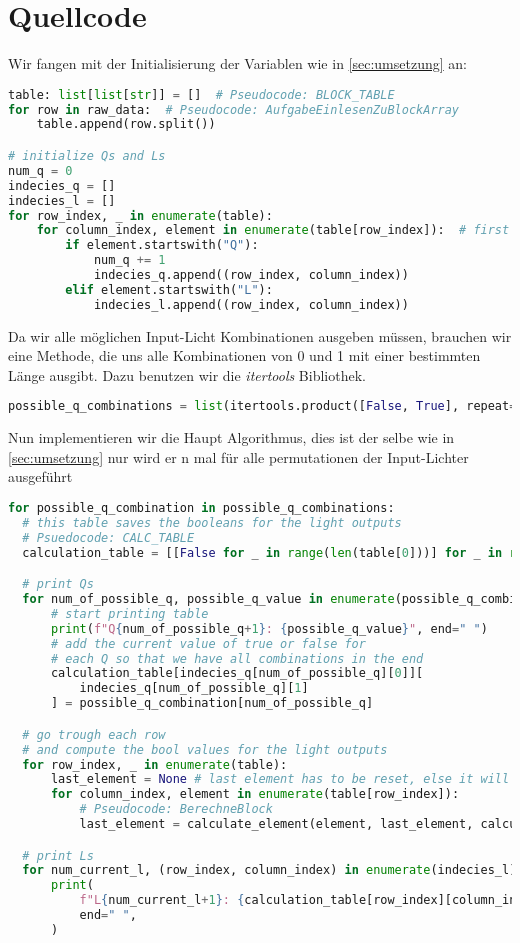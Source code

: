 \documentclass[a4paper,10pt,ngerman]{scrartcl}
\begin{document}
\section{Quellcode}
\label{Quellcode}\label{sec:quellcode}
Wir fangen mit der Initialisierung der Variablen wie in \cref{sec:umsetzung} an:
\begin{lstlisting}[language=Python]
table: list[list[str]] = []  # Pseudocode: BLOCK_TABLE
for row in raw_data:  # Pseudocode: AufgabeEinlesenZuBlockArray
    table.append(row.split())

# initialize Qs and Ls
num_q = 0
indecies_q = []
indecies_l = []
for row_index, _ in enumerate(table):
    for column_index, element in enumerate(table[row_index]):  # first row
        if element.startswith("Q"):
            num_q += 1
            indecies_q.append((row_index, column_index))
        elif element.startswith("L"):
            indecies_l.append((row_index, column_index))
\end{lstlisting}
Da wir alle möglichen Input-Licht Kombinationen ausgeben müssen, brauchen wir eine Methode, die uns alle Kombinationen von 0 und 1 mit einer bestimmten Länge ausgibt. Dazu benutzen wir die \emph{itertools} Bibliothek.
\begin{lstlisting}[language=Python]
possible_q_combinations = list(itertools.product([False, True], repeat=num_q))
\end{lstlisting}
Nun implementieren wir die Haupt Algorithmus, dies ist der selbe wie in \cref{sec:umsetzung} nur wird er n mal für alle permutationen der Input-Lichter ausgeführt
\begin{lstlisting}[language=Python]
for possible_q_combination in possible_q_combinations:
  # this table saves the booleans for the light outputs
  # Psuedocode: CALC_TABLE
  calculation_table = [[False for _ in range(len(table[0]))] for _ in range(len(table))]

  # print Qs
  for num_of_possible_q, possible_q_value in enumerate(possible_q_combination):
      # start printing table
      print(f"Q{num_of_possible_q+1}: {possible_q_value}", end=" ")
      # add the current value of true or false for
      # each Q so that we have all combinations in the end
      calculation_table[indecies_q[num_of_possible_q][0]][
          indecies_q[num_of_possible_q][1]
      ] = possible_q_combination[num_of_possible_q]

  # go trough each row
  # and compute the bool values for the light outputs
  for row_index, _ in enumerate(table):
      last_element = None # last element has to be reset, else it will think that blocks on the edge span over 2 rows
      for column_index, element in enumerate(table[row_index]):
          # Pseudocode: BerechneBlock
          last_element = calculate_element(element, last_element, calculation_table, row_index, column_index)

  # print Ls
  for num_current_l, (row_index, column_index) in enumerate(indecies_l):
      print(
          f"L{num_current_l+1}: {calculation_table[row_index][column_index]}",
          end=" ",
      )

\end{lstlisting}
\end{document}
